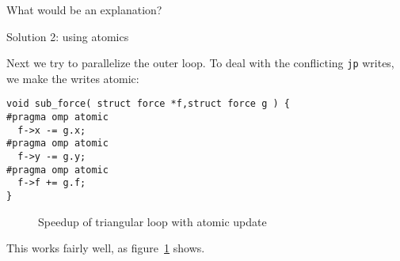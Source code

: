\begin{exercise}
  What would be an explanation?
\end{exercise}

 {Solution 2: using atomics}

Next we try to parallelize the outer loop.
To deal with the conflicting \lstinline{jp} writes,
we make the writes atomic:
\begin{lstlisting}
void sub_force( struct force *f,struct force g ) {
#pragma omp atomic
  f->x -= g.x;
#pragma omp atomic
  f->y -= g.y;
#pragma omp atomic
  f->f += g.f;
}
\end{lstlisting}

\begin{figure}[t]
  \label{fig:omp-nbody2}
  \caption{Speedup of triangular loop with atomic update}
\end{figure}

This works fairly well, as figure~\ref{fig:omp-nbody2} shows.

\begin{comment}
\begin{verbatim}
================ #threads = 1 ================
               Sequential: 2.029093e+01; 
 Triangular update atomic: 1.990096e+01; speedup= 1.02
================ #threads = 18 ================
 Triangular update atomic: 2.730043e+00; speedup= 7.43
================ #threads = 37 ================
 Triangular update atomic: 1.549876e+00; speedup=13.11
================ #threads = 56 ================
 Triangular update atomic: 1.187892e+00; speedup=17.11  
\end{verbatim}
\end{comment}

